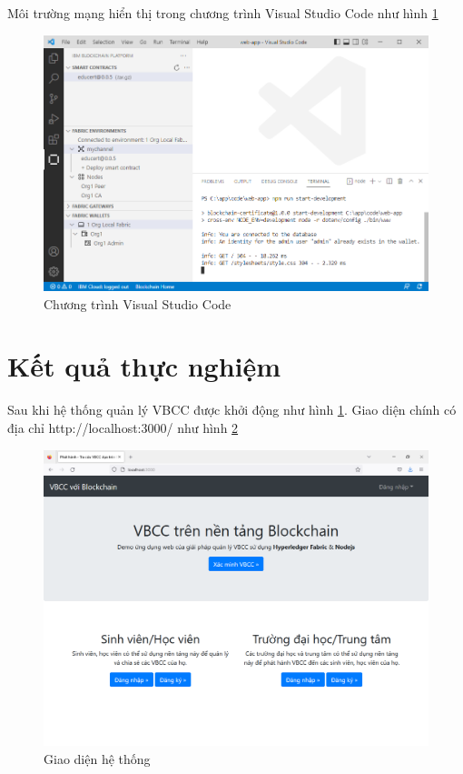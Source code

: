Môi trường mạng hiển thị trong chương trình Visual Studio Code như hình \ref{fig:ide_start}
\begin{figure}[htbp]
\centering
\includegraphics[width=.9\linewidth]{img/ide_start.PNG}
\caption{Chương trình Visual Studio Code}
\label{fig:ide_start}
\end{figure}

\section{Kết quả thực nghiệm}

Sau khi hệ thống quản lý VBCC được khởi động như hình \ref{fig:ide_start}. Giao diện chính có địa chỉ http://localhost:3000/ như hình \ref{fig:main_vbcc}

\begin{figure}[htbp]
\centering
\includegraphics[width=.9\linewidth]{img/main_vbcc.png}
\caption{Giao diện hệ thống}
\label{fig:main_vbcc}
\end{figure}




